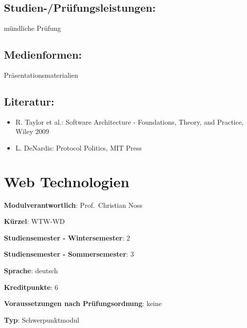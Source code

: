 \section*{Studien-/Prüfungsleistungen:}\label{studien-pruxfcfungsleistungen-22}

mündliche Prüfung

\section*{Medienformen:}\label{medienformen-22}

Präsentationsmaterialien

\section*{Literatur:}\label{literatur-22}

\begin{itemize}
\tightlist
\item
  R. Taylor et al.: Software Architecture - Foundations, Theory, and
  Practice, Wiley 2009
\item
  L. DeNardis: Protocol Politics, MIT Press
\end{itemize}

\chapter{Web Technologien}\label{web-technologien}

\begin{modulHead}
\textbf{Modulverantwortlich}: Prof.~Christian
Noss
\end{modulHead}
\begin{modulHead}
\textbf{Kürzel}:
WTW-WD
\end{modulHead}
\begin{modulHead}
\textbf{Studiensemester -
Wintersemester}:
2
\end{modulHead}
\begin{modulHead}
\textbf{Studiensemester -
Sommersemester}: 3
\end{modulHead}
\begin{modulHead}
\textbf{Sprache}:
deutsch
\end{modulHead}
\begin{modulHead}
\textbf{Kreditpunkte}:
6
\end{modulHead}
\begin{modulHead}
\textbf{Voraussetzungen nach
Prüfungsordnung}: keine
\end{modulHead}
\begin{modulHead}
\textbf{Typ}:
Schwerpunktmodul
\end{modulHead}


